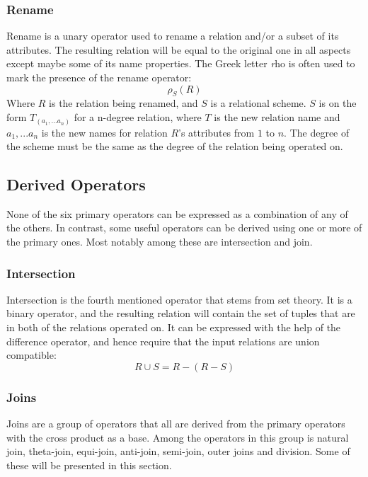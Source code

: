 \subsubsection{Rename}
Rename is a unary operator used to rename a relation and/or a subset of its attributes. The resulting relation
will be equal to the original one in all aspects except maybe some of its name properties. The Greek letter
\emph{r}ho is often used to mark the presence of the rename operator:
\begin{equation*}
\rho _{S}(R)
\end{equation*}
Where $R$ is the relation being renamed, and $S$ is a relational scheme. $S$ is on the form $T _{(a _{1},...a
_{n})}$ for a n-degree relation, where $T$ is the new relation name and $a _{1},...a _{n}$ is the new names for
relation $R$'s attributes from $1$ to $n$. The degree of the scheme must be the same as the degree of the relation
being operated on.

\subsection{Derived Operators}
None of the six primary operators can be expressed as a combination of any of the others. In contrast, some useful
operators can be derived using one or more of the primary ones. Most notably among these are intersection and join.

\subsubsection{Intersection}
Intersection is the fourth mentioned operator that stems from set theory. It is a binary operator, and the
resulting relation will contain the set of tuples that are in both of the relations operated on. It can be
expressed with the help of the difference operator, and hence require that the input relations are union compatible:
\begin{equation*}
R \cup S = R-(R-S)
\end{equation*}

\subsubsection{Joins}
Joins are a group of operators that all are derived from the primary operators with the cross product as a base.
Among the operators in this group is natural join, theta-join, equi-join, anti-join, semi-join, outer joins and
division. Some of these will be presented in this section.

